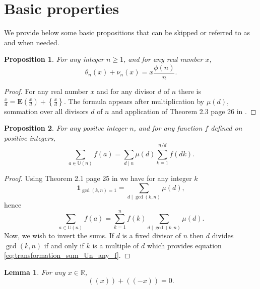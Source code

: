 \documentclass[a4paper,12pt]{article}
\newtheorem{lemma}{Lemma}[section]
\newtheorem{proposition}{Proposition}[section]
\newcommand{\IP}[1]{\textbf{E}\left( #1 \right)}
\newcommand{\FP}[1]{\left\{ #1 \right\}}
\newcommand{\setU}[1]{\mathbb{U}\left( #1 \right)}
\newcommand{\doublepari}[1]{\left(\!\left(#1\right)\!\right)}
\begin{document}
\section{Basic properties}

We provide below some basic propositions that can be skipped or referred to as and when needed.

\begin{proposition} For any integer $n\geq 1$, and for any real number $x$,
\begin{equation}\label{eq:theta_n_x_plus_nu_n_x}
\theta_n(x)+\nu_n(x) = x\frac{\phi(n)}{n}.
\end{equation}
\end{proposition}

\begin{proof} For any real number $x$ and for any divisor $d$ of $n$ there is $\frac{x}{d}=\IP{\frac{x}{d}} + \FP{\frac{x}{d}}$. The formula appears after multiplication by $\mu(d)$, sommation over all divisors $d$ of $n$ and application of Theorem 2.3 page 26 in \cite{apostol1976introduction}.
\end{proof}

\begin{proposition}\label{prop:transformation_sum_Un_any_f} For any positve integer $n$, and for any function $f$ defined on positive integers,
\begin{equation}
\sum_{a \in \setU{n}} f(a) = \sum_{d\mid n} \mu(d) \sum_{k=1}^{n/d} f(dk).
\label{eq:transformation_sum_Un_any_f}
\end{equation}
\end{proposition}

\begin{proof} Using Theorem 2.1 page 25 in \cite{apostol1976introduction} we have for any integer $k$
\begin{equation*}
\mathbf{1}_{\gcd(k,n)=1}=\sum_{d\mid \gcd(k,n)}\mu(d),
\end{equation*}
hence
\begin{equation*}
\sum_{a \in \setU{n}} f(a) = \sum_{k=1}^n f(k) \sum_{d\mid \gcd(k,n)}\mu(d).
\end{equation*}
Now, we wish to invert the sums. If $d$ is a fixed divisor of $n$ then $d$ divides $\gcd(k,n)$ if and only if $k$ is a multiple of $d$ which provides equation \ref{eq:transformation_sum_Un_any_f}.
\end{proof}

\begin{lemma}\label{lemma:sum_dpx_plus_dpmx_equals_zero} For any $x \in \mathbb{R}$,
\begin{equation}
\doublepari{x}+\doublepari{-x}=0.
\end{equation}
\end{lemma}
\end{document}
